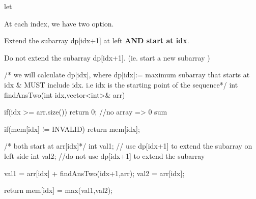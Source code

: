 \begin{solution}
    let 

    At each index, we have two option. 
    \begin{asparaenum}[(a)]
        \item Extend the subarray dp[idx+1] at left \textbf{AND start at idx}.
        \item Do not extend the subarray dp[idx+1]. (ie. start a new subarray )
    \end{asparaenum}

    \begin{code}
        /* we will calculate dp[idx], where
        dp[idx]:= maximum subarray that starts at idx & MUST include idx.
        i.e idx is the starting point of the sequence*/
        int findAnsTwo(int idx,vector<int>& arr)
        {
            if(idx >= arr.size()) return 0; //no array => 0 sum
            
            if(mem[idx] != INVALID)
                return mem[idx];
            
            /* both start at arr[idx]*/
            int val1; // use dp[idx+1] to extend the subarray on left side
            int val2; //do not use dp[idx+1] to extend the subarray
            
            val1 = arr[idx] + findAnsTwo(idx+1,arr);
            val2 = arr[idx];
            
            return mem[idx] = max(val1,val2);
        }
    \end{code}
\end{solution}